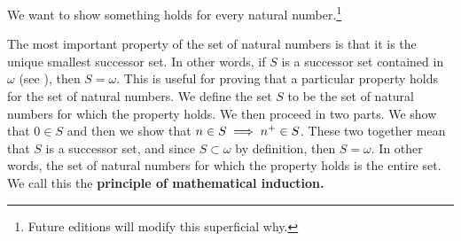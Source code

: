 

We want to show something holds for every natural number.\footnote{Future editions will modify this superficial why.}


The most important property of the set of natural numbers is that it is the unique smallest successor set.
In other words, if $S$ is a successor set contained in $\omega$ (see ), then $S = \omega$.
This is useful for proving that a particular property holds for the set of natural numbers.
We define the set $S$ to be the set of natural numbers for which the property holds.
We then proceed in two parts.
We show that $0 \in S$ and then we show that $n \in S \implies {n}^{+} \in S$.
These two together mean that $S$ is a successor set, and since $S \subset \omega$ by definition, then $S = \omega$.
In other words, the set of natural numbers for which the property holds is the entire set.
We call this the \textbf{principle of mathematical induction.}


%
%

\blankpage
